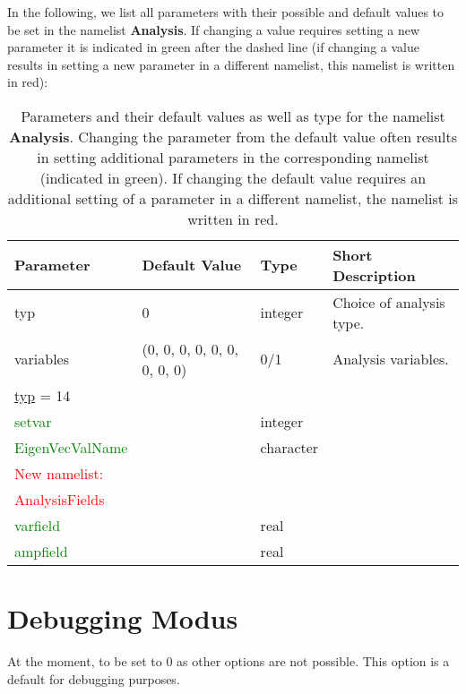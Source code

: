 \documentclass[12pt,twoside]{article}
\begin{document}
In the following, we list all parameters with their possible and default values to be set in the namelist \textbf{Analysis}.
If changing a value requires setting a new
parameter it is indicated in green after the dashed line (if changing a value results in setting a new
parameter in a different namelist, this namelist is written in red):\\

\begin{table}[H]
\caption{Parameters and their default values as well as type for the namelist \textbf{Analysis}.
         Changing the parameter from the default value often results in setting additional parameters
         in the corresponding namelist (indicated in green).
         If changing the default value requires an additional setting of a parameter in a different namelist,
         the namelist is written in red.}
\begin{center}
\begin{tabular}{|p{4cm}|p{2.7cm}|p{2cm}|p{4cm}|}
\hline
Parameter & Default Value & Type & Short Description \\
\hline
\hline
typ & 0 & integer & Choice of analysis type. \\
variables & (0, 0, 0, 0, 0, 0, 0, 0, 0) & 0/1 & Analysis variables.\\
\hdashline
\uline{typ} = 14 & & & \\
\textcolor{green}{setvar} & & integer & \\
\textcolor{green}{EigenVecValName} & & character & \\
\textcolor{red}{New namelist:} & & &\\
\textcolor{red}{AnalysisFields} & & &\\
\textcolor{green}{varfield} & & real & \\
\textcolor{green}{ampfield} & & real & \\
\hline
\end{tabular}
\end{center}
\label{analysis-table}
\end{table}

\newpage

\section{Debugging Modus}
\label{sec-block-dbg}

At the moment, to be set to $0$ as other options are not possible.
This option is a default for debugging purposes.
\end{document}
